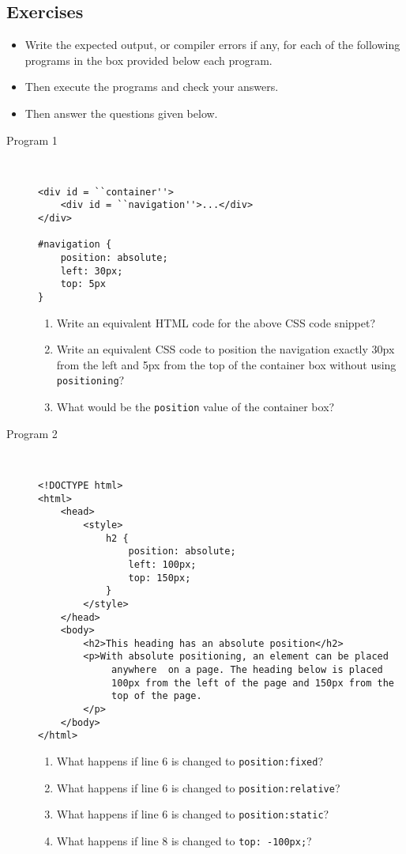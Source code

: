 \documentclass[11pt,a4paper]{article}
\def\AnswerBox{\fbox{\begin{minipage}{4in}\hfill\vspace{0.5in}\end{minipage}}}
\begin{document}
\subsection*{Exercises}
\begin{itemize}
\item Write the expected output, or compiler errors if any, for each of the following programs in the box provided below each program.
\item Then execute the programs and check your answers.
\item Then answer the questions given below.
\end{itemize}
\begin{description}
\item [Program 1]\
\begin{lstlisting}
<div id = ``container''>
    <div id = ``navigation''>...</div>
</div>

#navigation {
    position: absolute;
    left: 30px;
    top: 5px
}
\end{lstlisting}
\AnswerBox

\begin{enumerate}[label=\bfseries Q\arabic*:]\itemsep10pt
\item Write an equivalent HTML code for the above CSS code snippet?
\item Write an equivalent CSS code to position the navigation exactly 30px from the left and 5px from the top of the container box without using \texttt{positioning}?
\item What would be the \texttt{position} value of the container box?
\end{enumerate}
\item [Program 2]\
\begin{lstlisting}
<!DOCTYPE html>
<html>
    <head>
        <style>
            h2 {
                position: absolute;
                left: 100px;
                top: 150px;
            }
        </style>
    </head>
    <body>
        <h2>This heading has an absolute position</h2>
        <p>With absolute positioning, an element can be placed
             anywhere  on a page. The heading below is placed  
             100px from the left of the page and 150px from the 
             top of the page.
        </p>
    </body>
</html>
\end{lstlisting}

\AnswerBox

\begin{enumerate}[label=\bfseries Q\arabic*:]\itemsep10pt
\item What happens if line 6 is changed to \texttt{position:fixed}?
\item What happens if line 6 is changed to \texttt{position:relative}?
\item What happens if line 6 is changed to \texttt{position:static}?
\item What happens if line 8 is changed to \texttt{top: -100px;}?
\end{enumerate}


\end{description}
\end{document}
